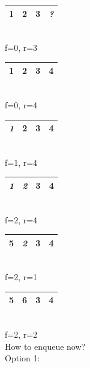 \documentclass[nobib]{tufte-handout}
\begin{document}
\begin{table}
    \centering
    \begin{tabular}{|c|c|c|c|}
        \hline
        \cellcolor{cyan}\textbf{1}&\cellcolor{cyan}\textbf{2}&\cellcolor{cyan}\textbf{3}&\textit{?}\\
        \hline
    \end{tabular}\\
    f=0, r=3\\
    \begin{tabular}{|c|c|c|c|}
        \hline
        \cellcolor{cyan}\textbf{1}&\cellcolor{cyan}\textbf{2}&\cellcolor{cyan}\textbf{3}&\cellcolor{cyan}\textbf{4}\\
        \hline
    \end{tabular}\\
    f=0, r=4\\
    \begin{tabular}{|c|c|c|c|}
        \hline
        \textit{1}&\cellcolor{cyan}\textbf{2}&\cellcolor{cyan}\textbf{3}&\cellcolor{cyan}\textbf{4}\\
        \hline
    \end{tabular}\\
    f=1, r=4\\
    \begin{tabular}{|c|c|c|c|}
        \hline
        \textit{1}&\textit{2}&\cellcolor{cyan}\textbf{3}&\cellcolor{cyan}\textbf{4}\\
        \hline
    \end{tabular}\\
    f=2, r=4\\
    \begin{tabular}{|c|c|c|c|}
        \hline
        \cellcolor{cyan}\textbf{5}&\textit{2}&\cellcolor{cyan}\textbf{3}&\cellcolor{cyan}\textbf{4}\\
        \hline
    \end{tabular}\\
    f=2, r=1\\
    \begin{tabular}{|c|c|c|c|}
        \hline
        \cellcolor{cyan}\textbf{5}&\cellcolor{cyan}\textbf{6}&\cellcolor{cyan}\textbf{3}&\cellcolor{cyan}\textbf{4}\\
        \hline
    \end{tabular}\\
    f=2, r=2\\
    How to enqueue now?\\
    Option 1:\\
    \begin{tabular}{|c|c|c|c|c|c|c|c|}

\end{tabular}
\end{table}
\end{document}

